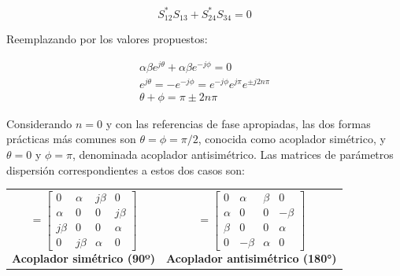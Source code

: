 \begin{equation}
    S_{12}^* S_{13} + S_{24}^* S_{34} = 0
\label{eq:producto3}
\end{equation}

Reemplazando por los valores propuestos:

\vspace{-0.5cm}
\begin{subequations}
    \begin{align}
        \alpha\beta e^{j\theta} + \alpha\beta e^{-j\phi} = 0         \\
        e^{j\theta} = -e^{-j\phi} = e^{-j\phi}e^{j\pi}e^{\pm j2n\pi} \\
        \theta + \phi = \pi \pm 2n\pi
    \end{align}
    \label{eq:phase_eqs}
\end{subequations}
\vspace{-0.5cm}

Considerando $n=0$ y con las referencias de fase apropiadas, las dos formas prácticas más comunes son $\theta=\phi=\pi/2$, conocida como acoplador simétrico, y $\theta=0$ y $\phi=\pi$, denominada acoplador antisimétrico. Las matrices de parámetros dispersión correspondientes a estos dos casos son:

\begin{table}[H]
    \centering
    \begin{tabular}{cc}
        \begin{minipage}{0.4\textwidth}
            \begin{equation}
            [S] = \begin{bmatrix}
            0      & \alpha & j\beta & 0      \\
            \alpha & 0      & 0      & j\beta \\
            j\beta & 0      & 0      & \alpha \\
            0      & j\beta & \alpha & 0
            \end{bmatrix}
            \end{equation}
        \vspace{0.5cm}
        \centering
        \textbf{Acoplador simétrico (90º)}
        \end{minipage} &
        
        \begin{minipage}{0.4\textwidth}
            \begin{equation}
            [S] = \begin{bmatrix}
            0      & \alpha & \beta  & 0      \\
            \alpha & 0      & 0      & -\beta \\
            \beta  & 0      & 0      & \alpha \\
            0      & -\beta & \alpha & 0
            \end{bmatrix}
            \end{equation}
        \vspace{0.5cm}
        \centering
        \textbf{Acoplador antisimétrico (180°)}
        \end{minipage}
    \end{tabular}
\end{table}

